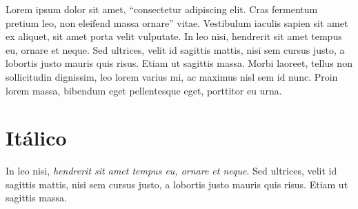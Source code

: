 Lorem ipsum dolor sit amet, \enquote{consectetur adipiscing elit. Cras fermentum pretium leo, non eleifend massa ornare} vitae. Vestibulum iaculis sapien sit amet ex aliquet, sit amet porta velit vulputate. In leo nisi, hendrerit sit amet tempus eu, ornare et neque. Sed ultrices, velit id sagittis mattis, nisi sem cursus justo, a lobortis justo mauris quis risus. Etiam ut sagittis massa. Morbi laoreet, tellus non sollicitudin dignissim, leo lorem varius mi, ac maximus nisl sem id nunc. Proin lorem massa, bibendum eget pellentesque eget, porttitor eu urna.

\section{Itálico}

In leo nisi, \textit{hendrerit sit amet tempus eu, ornare et neque}. Sed ultrices, velit id sagittis mattis, nisi sem cursus justo, a lobortis justo mauris quis risus. Etiam ut sagittis massa.